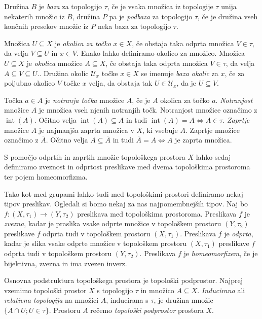 \documentclass[mat1]{fmfdelo}
\newcommand{\Ucurl}{\mathcal{U}}
\newcommand{\closure}[1]{\overline{#1}}
\DeclareMathOperator{\interior}{int}
\begin{document}
Družina $B$ je \emph{baza} za topologijo $\tau$, če je vsaka množica iz topologije $\tau$ unija nekaterih množic iz $B$, družina $P$ pa je \emph{podbaza} za topologijo $\tau$, če je družina vseh končnih presekov množic iz $P$ neka baza za topologijo $\tau$.

Množica $U \subseteq X$ je \emph{okolica za točko} $x \in X$, če obstaja taka odprta množica $V \in \tau$, da velja $V \subseteq U$ in $x \in V$. Enako lahko definiramo okolico za množico.
Množica $U \subseteq X$ je \emph{okolica} množice $A \subseteq X$, če obstaja taka odprta množica $V \in \tau$, da velja $A \subseteq V \subseteq U$..
Družina okolic $\Ucurl_x$ točke $x \in X$ se imenuje \emph{baza okolic} za $x$, če za poljubno okolico $V$ točke $x$ velja, da obstaja tak $U \in \Ucurl_x$, da je $U \subseteq V$.

Točka $a \in A$ je \emph{notranja točka} množice $A$, če je $A$ okolica za točko $a$.
\emph{Notranjost} množice $A$ je množica vseh njenih notranjih točk. Notranjost množice označimo z $\interior(A)$. Očitno velja $\interior(A) \subseteq A$ in tudi $\interior(A) = A \iff A \in \tau$.
\emph{Zaprtje} množice $A$ je najmanjša zaprta množica v $X$, ki vsebuje $A$. Zaprtje množice označimo z $\closure{A}$. Očitno velja $A \subseteq \closure{A}$ in tudi $\closure{A} = A \iff A$ je zaprta množica.

S pomočjo odprtih in zaprtih množic topološkega prostora $X$ lahko sedaj de\-fi\-ni\-ra\-mo zveznost in odprtost preslikave med dvema topološkima prostoroma ter pojem ho\-me\-o\-mor\-fiz\-ma.

Tako kot med grupami lahko tudi med topološkimi prostori definiramo nekaj tipov preslikav. Ogledali si bomo nekaj za nas najpomembnejših tipov.
Naj bo $f\colon (X, \tau_1) \to (Y, \tau_2)$ preslikava med topološkima prostoroma.
Preslikava $f$ je \emph{zvezna}, kadar je praslika vsake odprte množice v topološkem prostoru $(Y, \tau_2)$  preslikave $f$ odprta tudi v topološkem prostoru $(X, \tau_1)$.
Preslikava $f$ je \emph{odprta}, kadar je slika vsake odprte množice v topološkem prostoru $(X, \tau_1)$ preslikave $f$ odprta tudi v topološkem prostoru $(Y, \tau_2)$.
Preslikava $f$ je \emph{homeomorfizem}, če je bijektivna, zvezna in ima zvezen inverz.

Osnovna podstruktura topološkega prostora je topološki podprostor.
Najprej vzemimo topološki prostor $X$ s topologijo $\tau$ in množico $A \subseteq X$. \emph{Inducirana} ali \emph{relativna topologija} na množici $A$, inducirana s $\tau$, je družina množic $\lbrace A \cap U ; U \in \tau \rbrace$. Prostoru $A$ rečemo \emph{topološki podprostor} prostora $X$.
\end{document}
